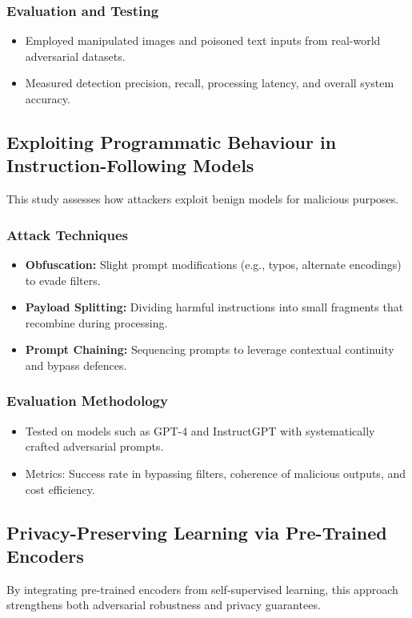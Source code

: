 \documentclass[journal]{IEEEtran}  %
\begin{document}
\subsubsection*{Evaluation and Testing}
\begin{itemize}
    \item Employed manipulated images and poisoned text inputs from real-world adversarial datasets.
    \item Measured detection precision, recall, processing latency, and overall system accuracy.
\end{itemize}

\subsection{Exploiting Programmatic Behaviour in Instruction-Following Models}
This study assesses how attackers exploit benign models for malicious purposes.
\subsubsection*{Attack Techniques}
\begin{itemize}
    \item \textbf{Obfuscation:} Slight prompt modifications (e.g., typos, alternate encodings) to evade filters.
    \item \textbf{Payload Splitting:} Dividing harmful instructions into small fragments that recombine during processing.
    \item \textbf{Prompt Chaining:} Sequencing prompts to leverage contextual continuity and bypass defences.
\end{itemize}

\subsubsection*{Evaluation Methodology}
\begin{itemize}
    \item Tested on models such as GPT-4 and InstructGPT with systematically crafted adversarial prompts.
    \item Metrics: Success rate in bypassing filters, coherence of malicious outputs, and cost efficiency.
\end{itemize}

\subsection{Privacy-Preserving Learning via Pre-Trained Encoders}
By integrating pre-trained encoders from self-supervised learning, this approach strengthens both adversarial robustness and privacy guarantees.
\end{document}
